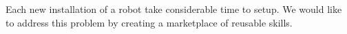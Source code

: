 Each new installation of a robot take considerable time to setup. We would like to address this problem by creating a marketplace of reusable skills. 